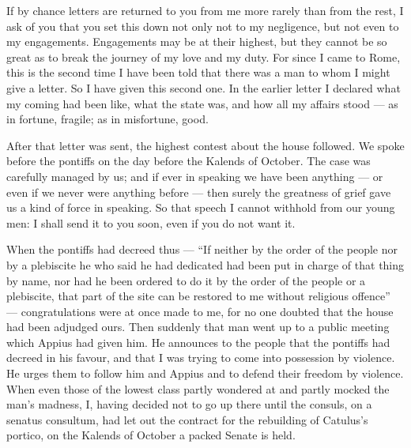 

 If by chance letters are returned to you from me more rarely than from the rest, I ask of you that you set this down not only not to my negligence, but not even to my engagements. Engagements may be at their highest, but they cannot be so great as to break the journey of my love and my duty. For since I came to Rome, this is the second time I have been told that there was a man to whom I might give a letter. So I have given this second one. In the earlier letter I declared what my coming had been like, what the state was, and how all my affairs stood --- as in fortune, fragile; as in misfortune, good.

 After that letter was sent, the highest contest about the house followed. We spoke before the pontiffs on the day before the Kalends of October. The case was carefully managed by us; and if ever in speaking we have been anything --- or even if we never were anything before --- then surely the greatness of grief gave us a kind of force in speaking. So that speech I cannot withhold from our young men: I shall send it to you soon, even if you do not want it.

 When the pontiffs had decreed thus --- ``If neither by the order of the people nor by a plebiscite he who said he had dedicated had been put in charge of that thing by name, nor had he been ordered to do it by the order of the people or a plebiscite, that part of the site can be restored to me without religious offence'' --- congratulations were at once made to me, for no one doubted that the house had been adjudged ours. Then suddenly that man went up to a public meeting which Appius had given him. He announces to the people that the pontiffs had decreed in his favour, and that I was trying to come into possession by violence. He urges them to follow him and Appius and to defend their freedom by violence. When even those of the lowest class partly wondered at and partly mocked the man's madness, I, having decided not to go up there until the consuls, on a senatus consultum, had let out the contract for the rebuilding of Catulus's portico, on the Kalends of October a packed Senate is held.


